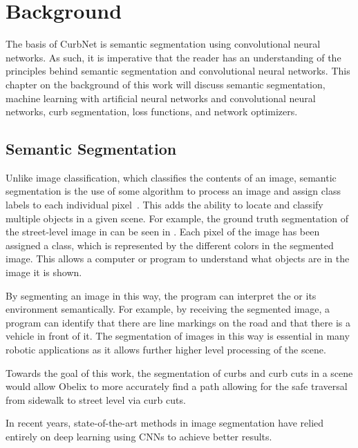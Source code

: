 \chapter{Background}\label{chap:background}
The basis of CurbNet is semantic segmentation using convolutional neural networks.
As such, it is imperative that the reader has an understanding of the principles behind semantic segmentation and convolutional neural networks.
This chapter on the background of this work will discuss semantic segmentation, machine learning with artificial neural networks and convolutional neural networks, curb segmentation, loss functions, and network optimizers.

\section{Semantic Segmentation}\label{section:background-segmentation}
Unlike image classification, which classifies the contents of an image, semantic segmentation is the use of some algorithm to process an image and assign class labels to each individual pixel~\cite{segmentation-medium}.
This adds the ability to locate and classify multiple objects in a given scene.
For example, the ground truth segmentation of the street-level image in  can be seen in .
Each pixel of the image has been assigned a class, which is represented by the different colors in the segmented image.
This allows a computer or program to understand what objects are in the image it is shown.



By segmenting an image in this way, the program can interpret the or its environment semantically.
For example, by receiving the segmented image, a program can identify that there are line markings on the road and that there is a vehicle in front of it.
The segmentation of images in this way is essential in many robotic applications as it allows further higher level processing of the scene.

Towards the goal of this work, the segmentation of curbs and curb cuts in a scene would allow Obelix to more accurately find a path allowing for the safe traversal from sidewalk to street level via curb cuts.

In recent years, state-of-the-art methods in image segmentation have relied entirely on deep learning using CNNs to achieve better results.



